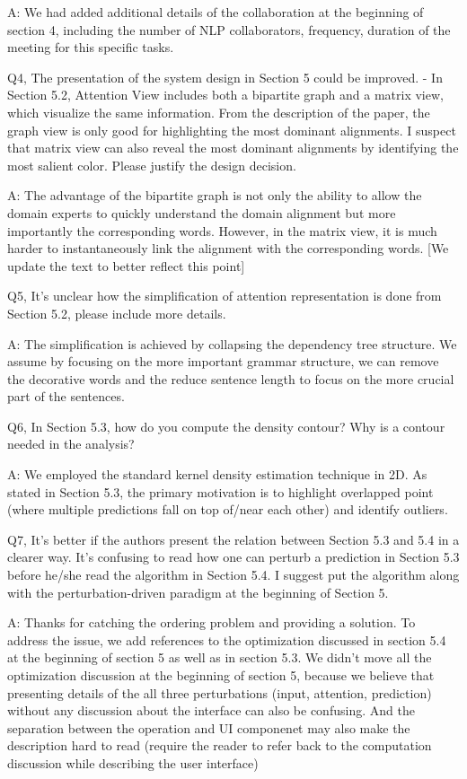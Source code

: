 A: We had added additional details of the collaboration at the beginning of section 4, including the number of NLP collaborators, frequency, duration of the meeting for this specific tasks.

Q4, The presentation of the system design in Section 5 could be improved.
- In Section 5.2, Attention View includes both a bipartite graph and a matrix view, which visualize the same information. From the description of the paper, the graph view is only good for highlighting the most dominant alignments. I suspect that matrix view can also reveal the most dominant alignments by identifying the most salient color. Please justify the design decision.

A: The advantage of the bipartite graph is not only the ability to allow the domain experts to quickly understand the domain alignment but more importantly the corresponding words. However, in the matrix view, it is much harder to instantaneously link the alignment with the corresponding words. [We update the text to better reflect this point]

Q5, It's unclear how the simplification of attention representation is done from Section 5.2, please include more details.

A: The simplification is achieved by collapsing the dependency tree structure. We assume by focusing on the more important grammar structure, we can remove the decorative words and the reduce sentence length to focus on the more crucial part of the sentences.

Q6, In Section 5.3, how do you compute the density contour? Why is a contour needed in the analysis?

A: We employed the standard kernel density estimation technique in 2D. As stated in Section 5.3, the primary motivation is to highlight overlapped point (where multiple predictions fall on top of/near each other) and identify outliers.

Q7, It's better if the authors present the relation between Section 5.3 and 5.4 in a clearer way. It's confusing to read how one can perturb a prediction in Section 5.3 before he/she read the algorithm in Section 5.4. I suggest put the algorithm along with the perturbation-driven paradigm at the beginning of Section 5.

A: Thanks for catching the ordering problem and providing a solution. To address the issue, we add references to the optimization discussed in section 5.4 at the beginning of section 5 as well as in section 5.3. We didn't move all the optimization discussion at the beginning of section 5, because we believe that presenting details of the all three perturbations (input, attention, prediction) without any discussion about the interface can also be confusing. And the separation between the operation and UI componenet may also make the description hard to read (require the reader to refer back to the computation discussion while describing the user interface)

